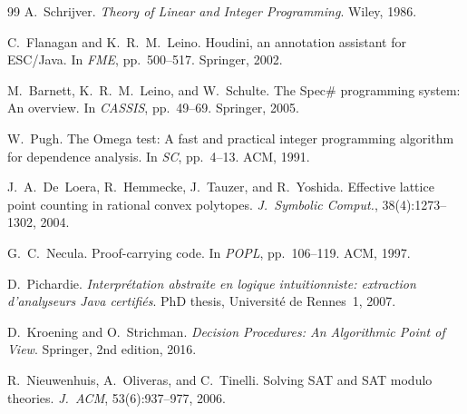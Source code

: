 \documentclass[11pt]{article}
\begin{document}
\begin{thebibliography}{99}
A.~Schrijver.
\newblock \emph{Theory of Linear and Integer Programming}.
\newblock Wiley, 1986.

C.~Flanagan and K.~R.~M.~Leino.
\newblock Houdini, an annotation assistant for {ESC/Java}.
\newblock In \emph{FME}, pp.~500--517. Springer, 2002.

M.~Barnett, K.~R.~M.~Leino, and W.~Schulte.
\newblock The {Spec\#} programming system: An overview.
\newblock In \emph{CASSIS}, pp.~49--69. Springer, 2005.

W.~Pugh.
\newblock The {Omega} test: A fast and practical integer programming
  algorithm for dependence analysis.
\newblock In \emph{SC}, pp.~4--13. ACM, 1991.

J.~A.~De~Loera, R.~Hemmecke, J.~Tauzer, and R.~Yoshida.
\newblock Effective lattice point counting in rational convex polytopes.
\newblock \emph{J.\ Symbolic Comput.}, 38(4):1273--1302, 2004.

G.~C.~Necula.
\newblock Proof-carrying code.
\newblock In \emph{POPL}, pp.~106--119. ACM, 1997.

D.~Pichardie.
\newblock \emph{Interprétation abstraite en logique intuitionniste:
  extraction d'analyseurs Java certifiés}.
\newblock PhD thesis, Université de Rennes~1, 2007.

D.~Kroening and O.~Strichman.
\newblock \emph{Decision Procedures: An Algorithmic Point of View}.
\newblock Springer, 2nd edition, 2016.

R.~Nieuwenhuis, A.~Oliveras, and C.~Tinelli.
\newblock Solving {SAT} and {SAT} modulo theories.
\newblock \emph{J.\ ACM}, 53(6):937--977, 2006.

\end{thebibliography}
\end{document}
